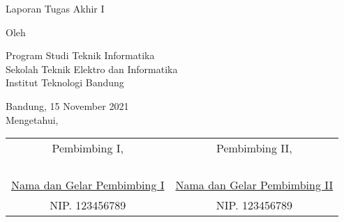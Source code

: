 \clearpage
\pagestyle{empty}

\begin{center}
    \smallskip

    \Large \bfseries \MakeUppercase{\thetitle}
    \vfill

    \Large Laporan Tugas Akhir I
    \vfill

    \large Oleh

    \Large \theauthor

    \large Program Studi Teknik Informatika \\

    \normalsize \normalfont
    Sekolah Teknik Elektro dan Informatika \\
    Institut Teknologi Bandung

    \vfill
    \normalsize \normalfont
    Bandung, 15 November 2021 \\
    Mengetahui,

    \vspace{0.5cm}
    \setlength{\tabcolsep}{12pt}
    \begin{tabular}{c@{\hskip 0.5in}c}
        Pembimbing I,                           & Pembimbing II,                           \\
                                                &                                          \\
                                                &                                          \\
                                                &                                          \\
                                                &                                          \\
        \underline{Nama dan Gelar Pembimbing I} & \underline{Nama dan Gelar Pembimbing II} \\
        NIP. 123456789                          & NIP. 123456789                           \\
    \end{tabular}

\end{center}
\clearpage
